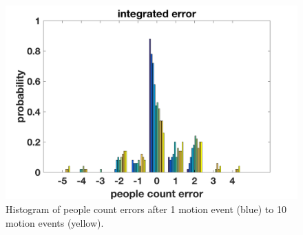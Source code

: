 \documentclass[12pt,oneside]{article} %
\begin{document}
\begin{figure}[htb]
\centering
\includegraphics[scale=0.52]{images/pcerror_gamma020_hist.png}
\caption{Histogram of people count errors after 1 motion event (blue) to 10 motion events (yellow).}
\label{hist}
\end{figure}





\parskip=0pt
\parsep=0pt
\clearpage



\end{document}

